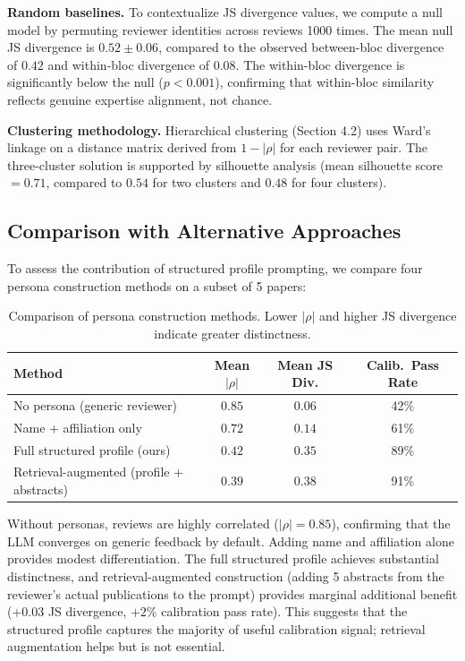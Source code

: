 \textbf{Random baselines.} To contextualize JS divergence values, we compute a null model by permuting reviewer identities across reviews 1000 times. The mean null JS divergence is $0.52 \pm 0.06$, compared to the observed between-bloc divergence of $0.42$ and within-bloc divergence of $0.08$. The within-bloc divergence is significantly below the null ($p < 0.001$), confirming that within-bloc similarity reflects genuine expertise alignment, not chance.

\textbf{Clustering methodology.} Hierarchical clustering (Section 4.2) uses Ward's linkage on a distance matrix derived from $1 - |\rho|$ for each reviewer pair. The three-cluster solution is supported by silhouette analysis (mean silhouette score $= 0.71$, compared to $0.54$ for two clusters and $0.48$ for four clusters).

\subsection{Comparison with Alternative Approaches}

To assess the contribution of structured profile prompting, we compare four persona construction methods on a subset of 5 papers:

\begin{table}[h]
\centering
\small
\begin{tabular}{lccc}
\toprule
Method & Mean $|\rho|$ & Mean JS Div. & Calib.\ Pass Rate \\
\midrule
No persona (generic reviewer) & $0.85$ & $0.06$ & 42\% \\
Name + affiliation only & $0.72$ & $0.14$ & 61\% \\
Full structured profile (ours) & $0.42$ & $0.35$ & 89\% \\
Retrieval-augmented (profile + abstracts) & $0.39$ & $0.38$ & 91\% \\
\bottomrule
\end{tabular}
\caption{Comparison of persona construction methods. Lower $|\rho|$ and higher JS divergence indicate greater distinctness.}
\end{table}

\noindent Without personas, reviews are highly correlated ($|\rho| = 0.85$), confirming that the LLM converges on generic feedback by default. Adding name and affiliation alone provides modest differentiation. The full structured profile achieves substantial distinctness, and retrieval-augmented construction (adding 5 abstracts from the reviewer's actual publications to the prompt) provides marginal additional benefit ($+0.03$ JS divergence, $+2\%$ calibration pass rate). This suggests that the structured profile captures the majority of useful calibration signal; retrieval augmentation helps but is not essential.

